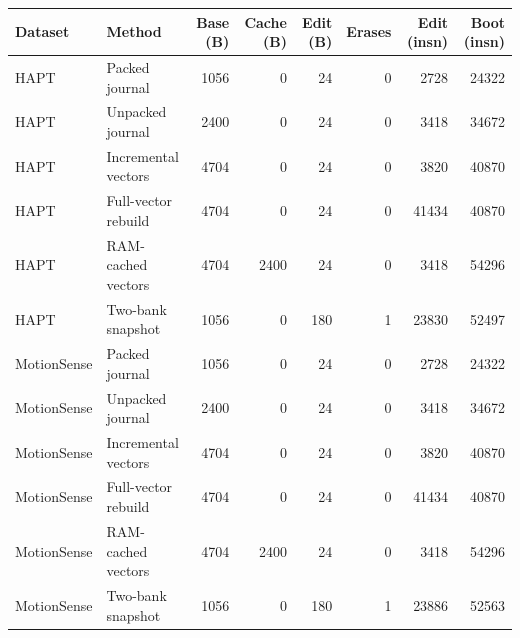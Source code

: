 \begin{tabular}{llrrrrrr}
\toprule
Dataset & Method & Base (B) & Cache (B) & Edit (B) & Erases & Edit (insn) & Boot (insn) \\
\midrule
HAPT & Packed journal & 1056 & 0 & 24 & 0 & 2728 & 24322 \\
HAPT & Unpacked journal & 2400 & 0 & 24 & 0 & 3418 & 34672 \\
HAPT & Incremental vectors & 4704 & 0 & 24 & 0 & 3820 & 40870 \\
HAPT & Full-vector rebuild & 4704 & 0 & 24 & 0 & 41434 & 40870 \\
HAPT & RAM-cached vectors & 4704 & 2400 & 24 & 0 & 3418 & 54296 \\
HAPT & Two-bank snapshot & 1056 & 0 & 180 & 1 & 23830 & 52497 \\
MotionSense & Packed journal & 1056 & 0 & 24 & 0 & 2728 & 24322 \\
MotionSense & Unpacked journal & 2400 & 0 & 24 & 0 & 3418 & 34672 \\
MotionSense & Incremental vectors & 4704 & 0 & 24 & 0 & 3820 & 40870 \\
MotionSense & Full-vector rebuild & 4704 & 0 & 24 & 0 & 41434 & 40870 \\
MotionSense & RAM-cached vectors & 4704 & 2400 & 24 & 0 & 3418 & 54296 \\
MotionSense & Two-bank snapshot & 1056 & 0 & 180 & 1 & 23886 & 52563 \\
\bottomrule
\end{tabular}
